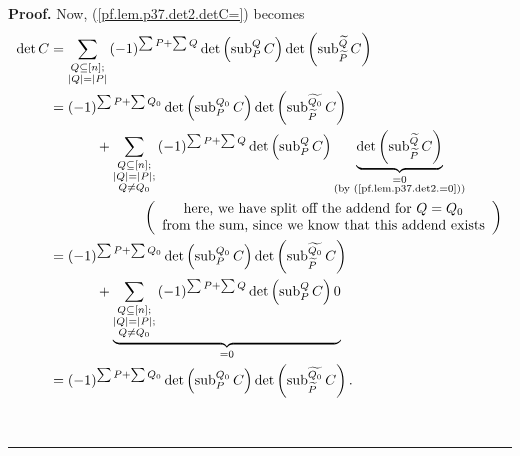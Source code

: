 \documentclass[numbers=enddot,12pt,final,onecolumn,notitlepage]{scrartcl}%
\theoremstyle{definition}
\newenvironment{proof}[1][Proof]{\noindent\textbf{#1.} }{\ \rule{0.5em}{0.5em}}
\let\sumnonlimits\sum
\renewcommand{\sum}{\sumnonlimits\limits}
\begin{document}
\begin{enumerate}
\begin{proof}
Now, (\ref{pf.lem.p37.det2.detC=}) becomes%
\begin{align}
\det C  &  =\sum_{\substack{Q\subseteq\left[  n\right]  ;\\\left\vert
Q\right\vert =\left\vert P\right\vert }}\left(  -1\right)  ^{\sum P+\sum
Q}\det\left(  \operatorname*{sub}\nolimits_{P}^{Q}C\right)  \det\left(
\operatorname*{sub}\nolimits_{\widetilde{P}}^{\widetilde{Q}}C\right)
\nonumber\\
&  =\left(  -1\right)  ^{\sum P+\sum Q_{0}}\det\left(  \operatorname*{sub}%
\nolimits_{P}^{Q_{0}}C\right)  \det\left(  \operatorname*{sub}%
\nolimits_{\widetilde{P}}^{\widetilde{Q_{0}}}C\right) \nonumber\\
&  \ \ \ \ \ \ \ \ \ \ +\sum_{\substack{Q\subseteq\left[  n\right]
;\\\left\vert Q\right\vert =\left\vert P\right\vert ;\\Q\neq Q_{0}}}\left(
-1\right)  ^{\sum P+\sum Q}\det\left(  \operatorname*{sub}\nolimits_{P}%
^{Q}C\right)  \underbrace{\det\left(  \operatorname*{sub}%
\nolimits_{\widetilde{P}}^{\widetilde{Q}}C\right)  }_{\substack{=0\\\text{(by
(\ref{pf.lem.p37.det2.=0}))}}}\nonumber\\
&  \ \ \ \ \ \ \ \ \ \ \ \ \ \ \ \ \ \ \ \ \left(
\begin{array}
[c]{c}%
\text{here, we have split off the addend for }Q=Q_{0}\\
\text{from the sum, since we know that this addend exists}%
\end{array}
\right) \nonumber\\
&  =\left(  -1\right)  ^{\sum P+\sum Q_{0}}\det\left(  \operatorname*{sub}%
\nolimits_{P}^{Q_{0}}C\right)  \det\left(  \operatorname*{sub}%
\nolimits_{\widetilde{P}}^{\widetilde{Q_{0}}}C\right) \nonumber\\
&  \ \ \ \ \ \ \ \ \ \ +\underbrace{\sum_{\substack{Q\subseteq\left[
n\right]  ;\\\left\vert Q\right\vert =\left\vert P\right\vert ;\\Q\neq Q_{0}%
}}\left(  -1\right)  ^{\sum P+\sum Q}\det\left(  \operatorname*{sub}%
\nolimits_{P}^{Q}C\right)  0}_{=0}\nonumber\\
&  =\left(  -1\right)  ^{\sum P+\sum Q_{0}}\det\left(  \operatorname*{sub}%
\nolimits_{P}^{Q_{0}}C\right)  \det\left(  \operatorname*{sub}%
\nolimits_{\widetilde{P}}^{\widetilde{Q_{0}}}C\right)  .
\label{pf.lem.p37.det2.detC=2}%
\end{align}



\end{proof}
\end{enumerate}
\end{document}
